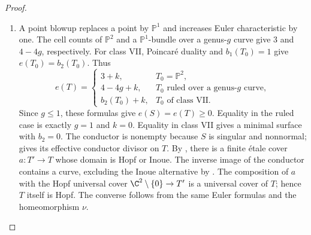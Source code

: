 \begin{proof}
\begin{enumerate}[label={$\langle1\rangle$\arabic*.},leftmargin=*]
\item A point blowup replaces a point by $\mathbb P^1$ and
increases Euler characteristic by one. The cell counts of
$\mathbb P^2$ and a $\mathbb P^1$-bundle over a genus-$g$
curve give $3$ and $4-4g$, respectively. For class VII,
Poincar\'e duality and $b_1(T_0)=1$ give $e(T_0)=b_2(T_0)$.
Thus
\[
 e(T)=\begin{cases}
 3+k,&T_0=\mathbb P^2,\\
 4-4g+k,&T_0\text{ ruled over a genus-}g\text{ curve},\\
 b_2(T_0)+k,&T_0\text{ of class VII}.
 \end{cases}
\]
Since $g\le1$, these formulas give
$e(S)=e(T)\ge0$. Equality in the ruled case is exactly
$g=1$ and $k=0$. Equality in class VII gives a minimal surface with
$b_2=0$. The conductor is nonempty because $S$ is singular
and nonnormal;  gives its effective
conductor divisor on $T$. By \cite[Theorem~1, p.~1]{BBK2019},
there is a finite \'etale cover $a:T'\to T$ whose domain is
Hopf or Inoue. The inverse image of the conductor contains
a curve, excluding the Inoue alternative by
\cite[Propositions~2(i) and~3(i), pp.~274--275 and~277,
and the paragraph after (21), p.~279]{Inoue1974}.
The composition of $a$ with the Hopf universal cover
$\C^2\setminus\{0\}\to T'$ is a universal cover of $T$;
hence $T$ itself is Hopf. The converse follows from the same Euler
formulas and the homeomorphism $\nu$.

\end{enumerate}
\end{proof}